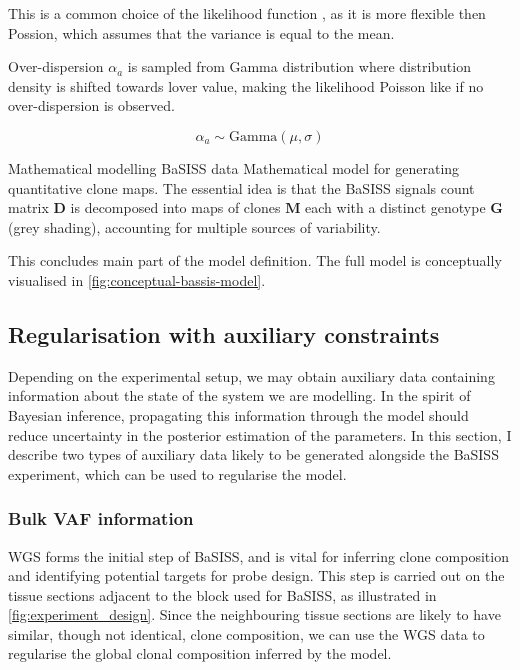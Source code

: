 This is a common choice of the likelihood function \parencite{Kleshchevnikov2022-ub, Townes2023-uj}, as it is more flexible then Possion, which assumes that the variance is equal to the mean.

Over-dispersion $\alpha_a$ is sampled from Gamma distribution where distribution density is shifted towards lover value, making the likelihood Poisson like if no over-dispersion is observed.

\begin{equation}
    {\alpha}_a \sim \mathrm{Gamma}(\mu, \sigma)
\end{equation} 

    {Mathematical modelling \ac{BaSISS} data}
    {Mathematical model for generating quantitative clone maps. The essential idea is that the \ac{BaSISS} signals count matrix $\mathbf{D}$ is decomposed into maps of clones $\mathbf{M}$ each with
    a distinct genotype $\mathbf{G}$ (grey shading), accounting for multiple sources of variability.}


This concludes main part of the model definition. The full model is conceptually visualised in \cref{fig:conceptual-bassis-model}.

\subsection{Regularisation with auxiliary constraints}
Depending on the experimental setup, we may obtain auxiliary data containing information about the state of the system we are modelling. In the spirit of Bayesian inference, propagating this information through the model should reduce uncertainty in the posterior estimation of the parameters. In this section, I describe two types of auxiliary data likely to be generated alongside the \ac{BaSISS} experiment, which can be used to regularise the model.

\subsubsection*{Bulk \acl{VAF} information}

\ac{WGS} forms the initial step of \ac{BaSISS}, and is vital for inferring clone composition and identifying potential targets for probe design. This step is carried out on the tissue sections adjacent to the block used for \ac{BaSISS}, as illustrated in \cref{fig:experiment_design}. Since the neighbouring tissue sections are likely to have similar, though not identical, clone composition, we can use the \ac{WGS} data to regularise the global clonal composition inferred by the model.

